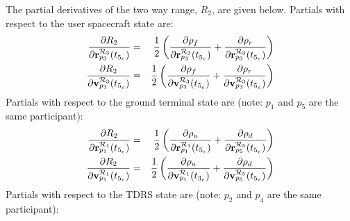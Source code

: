 The partial derivatives of the two way range, $R_2$, are given below.
Partials with respect to the user spacecraft state are:
%
\begin{eqnarray}
    \frac{\partial R_2}{\partial \mathbf{r}^{\mcR_3}_{p_3}(t_{5_e})} & = & \frac{1}{2}\left(\frac{\partial \rho_{f}}{\partial \mathbf{r}^{\mcR_3}_{p_3}(t_{5_e})} + \frac{\partial \rho_{r}}{\partial \mathbf{r}^{\mcR_3}_{p_3}(t_{5_e})} \right)\\
    \frac{\partial R_2}{\partial \mathbf{v}^{\mcR_3}_{p_3}(t_{5_e})} & = & \frac{1}{2}\left(\frac{\partial \rho_{f}}{\partial \mathbf{v}^{\mcR_3}_{p_3}(t_{5_e})} + \frac{\partial \rho_{r}}{\partial \mathbf{v}^{\mcR_3}_{p_3}(t_{5_e})} \right)\\
\end{eqnarray}
%
Partials with respect to the ground terminal state are (note: $p_1$ and $p_5$ are the same participant):
%
\begin{eqnarray}
    \frac{\partial R_2}{\partial \mathbf{r}^{\mcR_1}_{p_1}(t_{5_e})} & = & \frac{1}{2}\left(\frac{\partial \rho_{u}}{\partial \mathbf{r}^{\mcR_1}_{p_1}(t_{5_e})} + \frac{\partial \rho_{d}}{\partial \mathbf{r}^{\mcR_5}_{p_5}(t_{5_e})}\right)\\
    \frac{\partial R_2}{\partial \mathbf{v}^{\mcR_1}_{p_1}(t_{5_e})} & = & \frac{1}{2}\left(\frac{\partial \rho_{u}}{\partial \mathbf{v}^{\mcR_1}_{p_1}(t_{3_e})} + \frac{\partial \rho_{d}}{\partial \mathbf{v}^{\mcR_5}_{p_5}(t_{5_e})}\right)\\
\end{eqnarray}
%
Partials with respect to the TDRS state are (note: $p_2$ and $p_4$ are the same participant):
%
